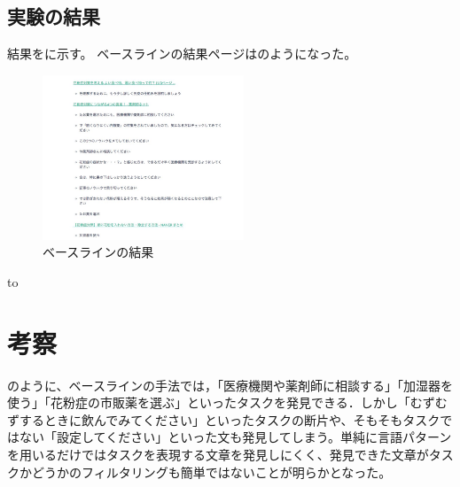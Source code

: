 \documentclass[submit,techreq]{ipsj}
\begin{document}
\subsection{実験の結果}

結果をに示す。
ベースラインの結果ページはのようになった。



\begin{figure}[tb]
\includegraphics[width=6cm, bb=0 0 550 719]{base_line3.jpg}
\caption{ベースラインの結果}
\label{fig:baseline_result}
\end{figure}




\begin{table}[tb] 
\caption{花粉症対策の方法タスク検索} 
\label{tab:result}
\hbox to
\end{table}



\section{考察}


のように、ベースラインの手法では，「医療機関や薬剤師に相談する」「加湿器を使う」「花粉症の市販薬を選ぶ」といったタスクを発見できる．しかし「むずむずするときに飲んでみてください」といったタスクの断片や、そもそもタスクではない「設定してください」といった文も発見してしまう。単純に言語パターンを用いるだけではタスクを表現する文章を発見しにくく、発見できた文章がタスクかどうかのフィルタリングも簡単ではないことが明らかとなった。
\end{document}
